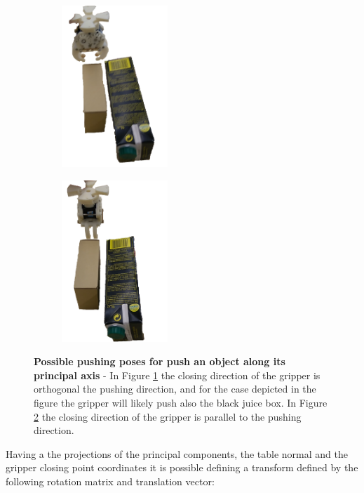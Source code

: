 \begin{figure}[h]
\centering
\begin{subfigure}[t]{0.45\textwidth}
\centering
\includegraphics[width=4cm]{Img/pushing/pushing333.png}
\caption{}\label{fig:pushing_way1}
\end{subfigure}
\begin{subfigure}[t]{0.45\textwidth}
\centering
\includegraphics[width=4cm]{Img/pushing/pushing222.png}
\caption{}\label{fig:pushing_way2}
\end{subfigure}
\caption{\textbf{Possible pushing poses for push an object along its principal axis} - In Figure \ref{fig:pushing_way1} the closing direction of the gripper is orthogonal the pushing direction, and for the case depicted in the figure the gripper will likely push also the black juice box. In Figure \ref{fig:pushing_way2} the closing direction of the gripper is parallel to the pushing direction.}\label{fig:pushing_way}
\end{figure}

Having a the projections of the principal components, the table normal and the gripper closing point coordinates it is possible defining a transform defined by the following rotation matrix and translation vector:

